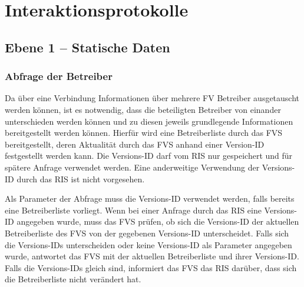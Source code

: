 \chapter{Interaktionsprotokolle}
\label{sec:Interaktionsprotokolle}

\section{Ebene 1 -- Statische Daten}


\subsection{Abfrage der Betreiber}
Da über eine Verbindung Informationen über mehrere FV Betreiber ausgetauscht werden können, ist es notwendig, dass die beteiligten Betreiber von einander unterschieden werden können und zu diesen jeweils grundlegende Informationen bereitgestellt werden können. Hierfür wird eine Betreiberliste durch das FVS bereitgestellt, deren Aktualität durch das FVS anhand einer Version-ID festgestellt werden kann. Die Versions-ID darf vom RIS nur gespeichert und für spätere Anfrage verwendet werden. Eine anderweitige Verwendung der Versions-ID durch das RIS ist nicht vorgesehen. 

Als Parameter der Abfrage muss die Versions-ID verwendet werden, falls bereits eine Betreiberliste vorliegt.
Wenn bei einer Anfrage durch das RIS eine Versions-ID angegeben wurde, muss das FVS prüfen, ob sich die Versions-ID der aktuellen Betreiberliste des FVS von der gegebenen Versions-ID unterscheidet. Falls sich die Versions-IDs unterscheiden oder keine Versions-ID als Parameter angegeben wurde, antwortet das FVS mit der aktuellen Betreiberliste und ihrer Versions-ID. Falls die Versions-IDs gleich sind, informiert das FVS das RIS darüber, dass sich die Betreiberliste nicht verändert hat.


